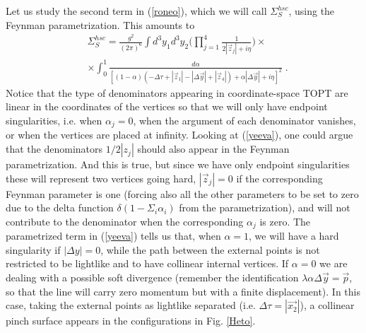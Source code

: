 \documentclass[%
 reprint,
 amsmath,amssymb,
 aps,
]{revtex4-1}
\begin{document}
 Let us study the second term in (\ref{roneo}), which we will call $\Sigma^{hsc}_S$, using the Feynman parametrization. This amounts to
 \begin{align}
 &\Sigma^{hsc}_S=\frac{g^2}{(2\pi)^6}\int d^3y_1d^3y_2\Big(\prod_{j=1}^4\frac{1}{2|\vec{z}_j|+i\eta}\Big)\times\nonumber\\
&\times \int_0^1 \frac{d\alpha}{[(1-\alpha)(-\Delta\tau+|\vec{z}_1|-|\Delta\vec{y}|+|\vec{z}_4|)+\alpha|\Delta\vec{y}|+i\eta]^2} \;.\label{yeeva}
 \end{align}
 Notice that the type of denominators appearing in coordinate-space TOPT are linear in the coordinates of the vertices so that we will only have endpoint singularities, i.e. when $\alpha_j=0$, when the argument of each denominator vanishes, or when the vertices are placed at infinity. Looking at (\ref{yeeva}), one could argue that the denominators $1/2|z_j|$ should also appear in the Feynman parametrization. And this is true, but since we have only endpoint singularities these will represent two vertices going hard, $|\vec{z}_j|=0$ if the corresponding Feynman parameter is one (forcing also all the other parameters to be set to zero due to the delta function $\delta(1-\Sigma_i\alpha_i)$ from the parametrization), and will not contribute to the denominator when the corresponding $\alpha_j$ is zero. The parametrized term in (\ref{yeeva}) tells us that, when $\alpha=1$, we will have a hard singularity if $|\Delta y|=0$, while the path between the external points is not restricted to be lightlike and to have collinear internal vertices. If $\alpha=0$ we are dealing with a possible soft divergence (remember the identification $\lambda\alpha\Delta \vec{y}=\vec{p}$, so that the line will carry zero momentum but with a finite displacement). In this case, taking the external points as lightlike separated (i.e. $\Delta\tau=|\vec{x_2}|$), a collinear pinch surface appears in the configurations in Fig. \ref{Heto}.
\end{document}
